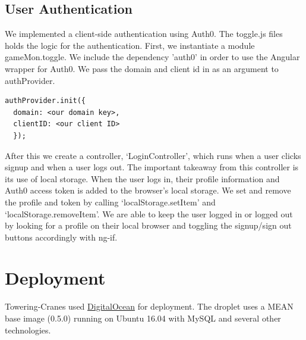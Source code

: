 \documentclass{article}
\begin{document}
\subsection{User Authentication}
We implemented a client-side authentication using Auth0. The toggle.js files holds the logic for the authentication. First, we instantiate a module gameMon.toggle. We include the dependency 'auth0' in order to use the Angular wrapper for Auth0. We pass the domain and client id in as an argument to authProvider.
\begin{lstlisting}
authProvider.init({
  domain: <our domain key>,
  clientID: <our client ID>
  });
\end{lstlisting}
After this we create a controller, ‘LoginController’, which runs when a user clicks signup and when a user logs out.  The important takeaway from this controller is its use of local storage.  When the user logs in, their profile information and Auth0 access token is added to the browser’s local storage.  We set and remove the profile and token by calling ‘localStorage.setItem’ and ‘localStorage.removeItem’. We are able to keep the user logged in or logged out by looking for a profile on their local browser and toggling the signup/sign out buttons accordingly with ng-if.

\section{Deployment}
Towering-Cranes used \href{http://www.digitalocean.com/}{DigitalOcean} for deployment. The droplet uses a MEAN base image (0.5.0) running on Ubuntu 16.04 with MySQL and several other technologies.
\end{document}
